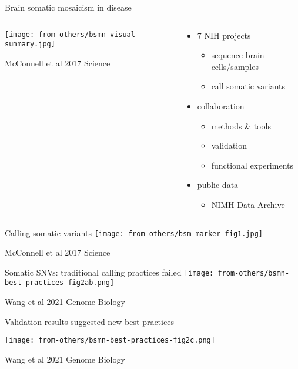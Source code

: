\documentclass[usenames,dvipsnames]{beamer}
\begin{document}
\begin{frame}{Brain somatic mosaicism in disease}
\begin{columns}[t]
\begin{column}{0.6\textwidth}

\texttt{[image: from-others/bsmn-visual-summary.jpg]}

{\tiny McConnell et al 2017 Science}
\end{column}

\begin{column}{0.4\textwidth}
\begin{itemize}
\item 7 NIH projects
	\begin{itemize}
	\item sequence brain cells/samples
	\item call somatic variants
	\end{itemize}
\item collaboration
	\begin{itemize}
	\item methods \& tools 
        \item validation
        \item functional experiments
	\end{itemize}
\item public data
	\begin{itemize}
		\item NIMH Data Archive
	\end{itemize}
\end{itemize}
\end{column}
\end{columns}
\end{frame}

\begin{frame}{Calling somatic variants}
\texttt{[image: from-others/bsm-marker-fig1.jpg]}

{\tiny McConnell et al 2017 Science}
\end{frame}

\begin{frame}{Somatic SNVs: traditional calling practices failed}
\texttt{[image: from-others/bsmn-best-practices-fig2ab.png]}

{\tiny Wang et al 2021 Genome Biology}
\end{frame}

\begin{frame}{Validation results suggested new best practices}
\begin{center}
\texttt{[image: from-others/bsmn-best-practices-fig2c.png]}
\end{center}

{\tiny Wang et al 2021 Genome Biology}
\end{frame}
\end{document}
